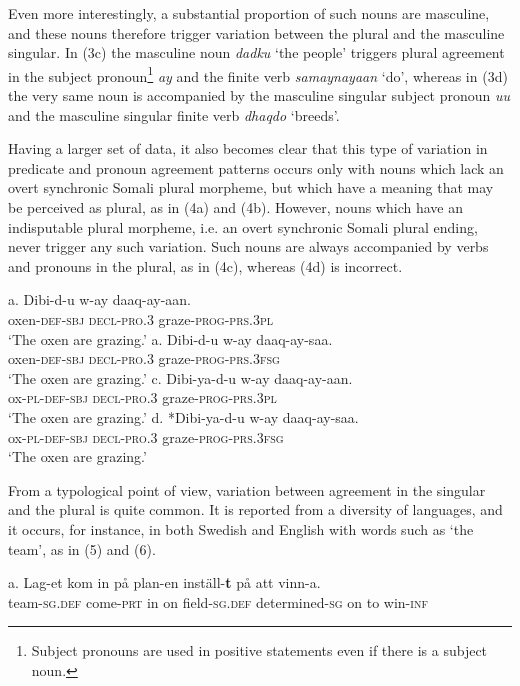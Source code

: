 \documentclass[output=paper]{langsci/langscibook}
\begin{document}
Even more interestingly, a substantial proportion of such nouns are masculine, and these nouns therefore trigger variation between the plural and the masculine singular. In (3c) the masculine noun \textit{dadku} ‘the people’ triggers plural agreement in the subject pronoun\footnote{Subject pronouns are used in positive statements even if there is a subject noun.} \textit{ay} and the finite verb \textit{samaynayaan} ‘do’, whereas in (3d) the very same noun is accompanied by the masculine singular subject pronoun \textit{uu} and the masculine singular finite verb \textit{dhaqdo} ‘breeds’. 

Having a larger set of data, it also becomes clear that this type of variation in predicate and pronoun agreement patterns occurs only with nouns which lack an overt synchronic Somali plural morpheme, but which have a meaning that may be perceived as plural, as in (4a) and (4b). However, nouns which have an indisputable plural morpheme, i.e. an overt synchronic Somali plural ending, never trigger any such variation. Such nouns are always accompanied by verbs and pronouns in the plural, as in (4c), whereas (4d) is incorrect.

\ea
\ea
\gll a. Dibi-d-u     w-ay     daaq-ay-aan.\\
       oxen-\textsc{def-sbj   decl-pro.3}  graze-\textsc{prog-prs.3pl}\\
\glt ‘The oxen are grazing.’
\ex
\gll a. Dibi-d-u    w-ay    daaq-ay-saa.\\
       oxen\textsc{{}-def-sbj  decl-pro.3}  graze-\textsc{prog-prs.3fsg}\\
\glt ‘The oxen are grazing.’
\ex
\gll c. Dibi-ya-d-u    w-ay    daaq-ay-aan.\\
       ox\textsc{{}-pl-def-sbj  decl-pro.3}  graze-\textsc{prog-prs.3pl}\\
\glt ‘The oxen are grazing.’
\ex
\gll d. *Dibi-ya-d-u    w-ay    daaq-ay-saa.\\
       ox\textsc{{}-pl-def-sbj  decl-pro.3}  graze\textsc{{}-prog-prs.3fsg}\\
\glt ‘The oxen are grazing.’
\z
\z

From a typological point of view, variation between agreement in the singular and the plural is quite common. It is reported from a diversity of languages, and it occurs, for instance, in both Swedish and English with words such as ‘the team’, as in (5) and (6).

\ea
\ea
\gll a.  Lag-et           kom          in på plan-en        inställ-\textbf{t}            på att vinn-a.\\
       team-\textsc{sg.def} come-\textsc{prt} in on field-\textsc{sg.def} determined-\textsc{sg} on to  win-\textsc{inf}\\
\end{document}
